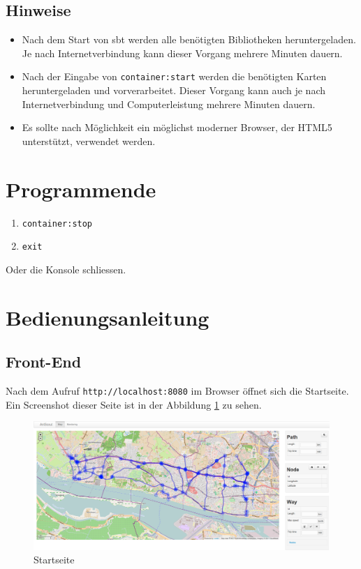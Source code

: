 \subsection{Hinweise}
\label{sec:hinweise}

\begin{itemize}
  \item Nach dem Start von \ac{sbt} werden alle benötigten Bibliotheken heruntergeladen.
    Je nach Internetverbindung kann dieser Vorgang mehrere Minuten dauern.
  \item Nach der Eingabe von \texttt{container:start} werden die benötigten Karten heruntergeladen und vorverarbeitet.
    Dieser Vorgang kann auch je nach Internetverbindung und Computerleistung mehrere Minuten dauern.
  \item Es sollte nach Möglichkeit ein möglichst moderner Browser, der HTML5 unterstützt, verwendet werden.
\end{itemize}

\section{Programmende}
\label{sec:programmende}

\begin{enumerate}
  \item \texttt{container:stop}
  \item \texttt{exit}
\end{enumerate}

Oder die Konsole schliessen.

\section{Bedienungsanleitung}
\label{sec:bedienungsanleitung}

\subsection{Front-End}
\label{sec:front-end}

Nach dem Aufruf \texttt{http://localhost:8080} im Browser öffnet sich die Startseite.
Ein Screenshot dieser Seite ist in der Abbildung \ref{fig:startseite} zu sehen.

\begin{figure}[htbp]
  \centering
  \includegraphics[width=\textwidth]{Bilder/Startseite.png}
  \caption{Startseite}
  \label{fig:startseite}
\end{figure}

